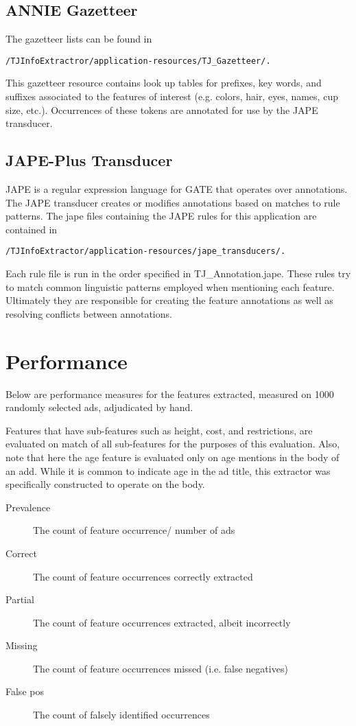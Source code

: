 \documentclass{article}
\begin{document}
\subsection{{ANNIE Gazetteer}}

The gazetteer lists can be found in 
\begin{lstlisting}[style=Bash]
/TJInfoExtractror/application-resources/TJ_Gazetteer/.
\end{lstlisting} This gazetteer resource
contains look up tables for prefixes, key words, and suffixes associated to the features of interest (e.g. colors, hair, eyes,
names, cup size, etc.). Occurrences of these tokens are annotated for use by the {JAPE} transducer.

\subsection{{JAPE-Plus Transducer}}

{JAPE} is a regular expression language for {GATE} that operates over annotations. The {JAPE} transducer creates or 
modifies annotations based on matches to rule patterns. The jape files containing the {JAPE} rules for this application
are contained in 
\begin{lstlisting}[style=Bash]
/TJInfoExtractor/application-resources/jape_transducers/.
\end{lstlisting}
Each rule file is run in the order specified in {TJ\_Annotation.jape}. These rules try to match common linguistic patterns
employed when mentioning each feature. Ultimately they are responsible for creating the feature annotations as well as resolving
conflicts between annotations. 

\section{Performance}
Below are performance measures for the features extracted, measured on
1000 randomly selected ads, adjudicated by hand.

Features that have sub-features such as height, cost, and restrictions, are
evaluated on match of all sub-features for the purposes of this evaluation.
Also, note that here the age feature is evaluated only on age mentions in the body of
an add. While it is common to indicate age in the ad title, this extractor was specifically
constructed to operate on the body.

\begin{description}
\item[Prevalence] The count of feature occurrence/ number of ads
\item[Correct] The count of feature occurrences correctly extracted
\item[Partial] The count of feature occurrences extracted, albeit incorrectly
\item[Missing] The count of feature occurrences missed (i.e. false negatives)
\item[False pos] The count of falsely identified occurrences
\end{description}
\end{document}
